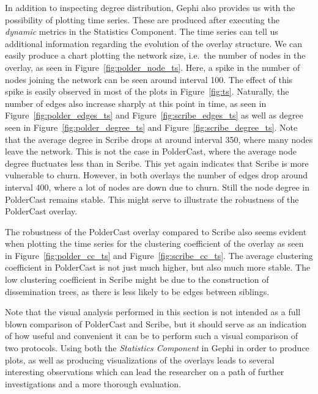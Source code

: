 In addition to inspecting degree distribution, Gephi also provides us
with the possibility of plotting time series. These are produced after
executing the \emph{dynamic} metrics in the Statistics Component.  The
time series can tell us additional information regarding the evolution
of the overlay structure. We can easily produce a chart plotting the
network size, i.e.\ the number of nodes in the overlay, as seen in
Figure~\ref{fig:polder_node_ts}.  Here, a spike in the number of nodes
joining the network can be seen around interval 100. The effect of this
spike is easily observed in most of the plots in Figure~\ref{fig:ts}.
Naturally, the number of edges also increase sharply at this point in
time, as seen in Figure~\ref{fig:polder_edges_ts} and
Figure~\ref{fig:scribe_edges_ts} as well as degree seen in
Figure~\ref{fig:polder_degree_ts} and Figure~\ref{fig:scribe_degree_ts}.
Note that the average degree in Scribe drops at around interval 350,
where many nodes leave the network. This is not the case in PolderCast,
where the average node degree fluctuates less than in Scribe. This yet
again indicates that Scribe is more vulnerable to churn. However, in
both overlays the number of edges drop around interval 400, where a lot
of nodes are down due to churn. Still the node degree in PolderCast
remains stable. This might serve to illustrate the robustness of the PolderCast overlay.

The robustness of the PolderCast overlay compared to Scribe also seems
evident when plotting the time series for the clustering coefficient of
the overlay as seen in Figure~\ref{fig:polder_cc_ts} and
Figure~\ref{fig:scribe_cc_ts}. The average clustering coefficient in
PolderCast is not just much higher, but also much more stable. The low
clustering coefficient in Scribe might be due to the construction of
dissemination trees, as there is less likely to be edges between
siblings.

Note that the visual analysis performed in this section is not intended as a
full blown comparison of PolderCast and Scribe, but it should serve as
an indication of how useful and convenient it can be to perform such a
visual comparison of two protocols. Using both the \emph{Statistics
    Component} in Gephi in order to produce plots, as well as producing
visualizations of the overlays leads to several interesting observations
which can lead the researcher on a path of further investigations and a
more thorough evaluation.

